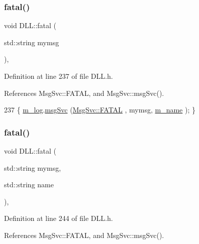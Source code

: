 \subsubsection{\texorpdfstring{fatal()}{fatal()}\hspace{0.1cm}{\footnotesize\ttfamily [1/2]}}
{\footnotesize\ttfamily void D\+L\+L\+::fatal (\begin{DoxyParamCaption}\item[{std\+::string}]{mymsg }\end{DoxyParamCaption})\hspace{0.3cm}{\ttfamily [inline]}, {\ttfamily [private]}}



Definition at line 237 of file D\+L\+L.\+h.



References Msg\+Svc\+::\+F\+A\+T\+AL, and Msg\+Svc\+::msg\+Svc().


\begin{DoxyCode}
237 \{ \hyperlink{classDLL_a6e66cd993e2d142b48691557ce8e4047}{m\_log}.\hyperlink{classMsgSvc_ad25f18047920cc59a314e5098259711c}{msgSvc} (\hyperlink{classMsgSvc_ae671eb7301996cd049d2da8a65925926a59c73cb29edfc9cdf35845e2b1301363}{MsgSvc::FATAL}   , mymsg, \hyperlink{classDLL_ad5e4d36d8c2575447f73acc2a703b405}{m\_name} ); \}
\end{DoxyCode}
\mbox{\label{classDLL_ada1bec81505d4e419e995004a2eb180e}} 
\subsubsection{\texorpdfstring{fatal()}{fatal()}\hspace{0.1cm}{\footnotesize\ttfamily [2/2]}}
{\footnotesize\ttfamily void D\+L\+L\+::fatal (\begin{DoxyParamCaption}\item[{std\+::string}]{mymsg,  }\item[{std\+::string}]{name }\end{DoxyParamCaption})\hspace{0.3cm}{\ttfamily [inline]}, {\ttfamily [private]}}



Definition at line 244 of file D\+L\+L.\+h.



References Msg\+Svc\+::\+F\+A\+T\+AL, and Msg\+Svc\+::msg\+Svc().


